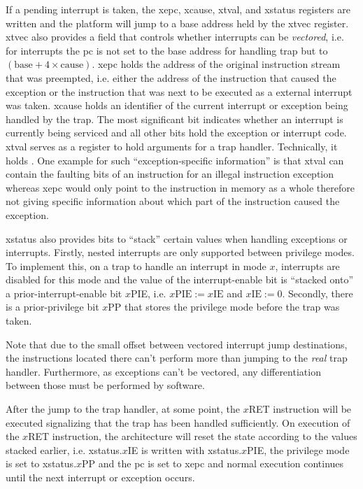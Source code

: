 If a pending interrupt is taken, the \gls{xepc}, \gls{xcause}, \gls{xtval}, and \gls{xstatus} registers are written and the platform will jump to a base address held by the \gls{xtvec} register.
\gls{xtvec} also provides a field that controls whether interrupts can be \textit{vectored}, i.e. for interrupts the \gls{pc} is not set to the base address for handling trap but to $ (\text{base} + 4 \times \text{cause}) $.
\gls{xepc} holds the address of the original instruction stream that was preempted, i.e. either the address of the instruction that caused the exception or the instruction that was next to be executed as a external interrupt was taken.
\gls{xcause} holds an identifier of the current interrupt or exception being handled by the trap.
The most significant bit indicates whether an interrupt is currently being serviced and all other bits hold the exception or interrupt code.
\gls{xtval} serves as a register to hold arguments for a trap handler.
Technically, it holds .
One example for such \enquote{exception-specific information} is that \gls{xtval} can contain the faulting bits of an instruction for an illegal instruction exception whereas \gls{xepc} would only point to the instruction in memory as a whole therefore not giving specific information about which part of the instruction caused the exception.

\gls{xstatus} also provides bits to \enquote{stack} certain values when handling exceptions or interrupts.
Firstly, nested interrupts are only supported between privilege modes.
To implement this, on a trap to handle an interrupt in mode $ x $, interrupts are disabled for this mode and the value of the interrupt-enable bit is \enquote{stacked onto} a prior-interrupt-enable bit $x$PIE, i.e. $ x\text{PIE} := x\text{IE} $ and $ x\text{IE} := 0 $.
Secondly, there is a prior-privilege bit $x$PP that stores the privilege mode before the trap was taken.

Note that due to the small offset between vectored interrupt jump destinations, the instructions located there can't perform more than jumping to the \textit{real} trap handler.
Furthermore, as exceptions can't be vectored, any differentiation between those must be performed by software.

After the jump to the trap handler, at some point, the $x$RET instruction will be executed signalizing that the trap has been handled sufficiently.
On execution of the $x$RET instruction, the architecture will reset the state according to the values stacked earlier, i.e. \gls{xstatus}.$x$IE is written with \gls{xstatus}.$x$PIE, the privilege mode is set to \gls{xstatus}.$x$PP and the \gls{pc} is set to \gls{xepc} and normal execution continues until the next interrupt or exception occurs.

